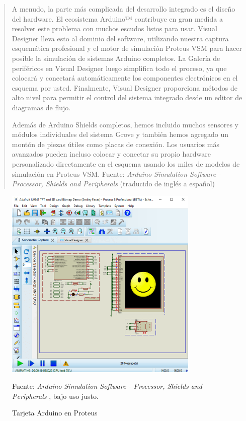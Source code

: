 \documentclass{article}
\begin{document}
    \begin{quote}
        A menudo, la parte más complicada del desarrollo integrado es el
        diseño del hardware. El ecosistema Arduino™ contribuye en gran medida
        a resolver este problema con muchos escudos listos para usar. Visual
        Designer lleva esto al dominio del software, utilizando nuestra
        captura esquemática profesional y el motor de simulación Proteus VSM
        para hacer posible la simulación de sistemas Arduino completos. La
        Galería de periféricos en Visual Designer luego simplifica todo el
        proceso, ya que colocará y conectará automáticamente los componentes
        electrónicos en el esquema por usted. Finalmente, Visual Designer
        proporciona métodos de alto nivel para permitir el control del
        sistema integrado desde un editor de diagramas de flujo.

        \bigbreak

        Además de Arduino Shields completos, hemos incluido muchos sensores y
        módulos individuales del sistema Grove y también hemos agregado un
        montón de piezas útiles como placas de conexión. Los usuarios más
        avanzados pueden incluso colocar y conectar su propio hardware
        personalizado directamente en el esquema usando los miles de modelos
        de simulación en Proteus VSM.\bigbreak \footnotesize
        Fuente: \textit{Arduino Simulation Software - Processor, Shields and
        Peripherals} (traducido de inglés a español)
        \cite{labcenter-electronics-2022}
    \end{quote}

    \begin{figure}[H]
        \centering
        \includegraphics[width=0.3\paperwidth]{images/schematic}
        \caption{Tarjeta Arduino en Proteus}\footnotesize
        Fuente: \textit{Arduino Simulation Software - Processor, Shields and
        Peripherals} \cite{labcenter-electronics-2022}, bajo uso justo.
    \end{figure}
\end{document}
